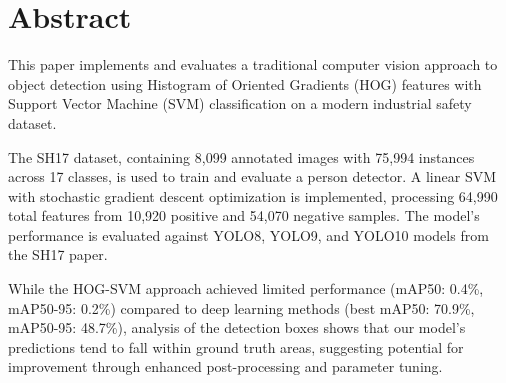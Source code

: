 \section{Abstract}

This paper implements and evaluates a traditional computer vision approach to object detection using Histogram of Oriented Gradients (HOG) features with Support Vector Machine (SVM) classification on a modern industrial safety dataset. 

The SH17 dataset, containing 8,099 annotated images with 75,994 instances across 17 classes, is used to train and evaluate a person detector.
A linear SVM with stochastic gradient descent optimization is implemented, processing 64,990 total features from 10,920 positive and 54,070 negative samples. 
The model's performance is evaluated against YOLO8, YOLO9, and YOLO10 models from the SH17 paper.

While the HOG-SVM approach achieved limited performance (mAP50: 0.4\%, mAP50-95: 0.2\%) compared to deep learning methods (best mAP50: 70.9\%, mAP50-95: 48.7\%), analysis of the detection boxes shows that our model's predictions tend to fall within ground truth areas, suggesting potential for improvement through enhanced post-processing and parameter tuning.